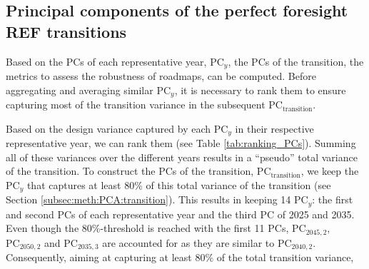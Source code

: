 \subsection{Principal components of the perfect foresight REF transitions}
\label{subsec:RobPol:PC_transition}
Based on the \gls{PCs} of each representative year, $\text{PC}_{y}$, the \gls{PCs} of the transition, \ie the metrics to assess the robustness of roadmaps, can be computed. Before aggregating and averaging similar $\text{PC}_{y}$, it is necessary to rank them to ensure capturing most of the transition variance in the subsequent $\text{PC}_{\text{transition}}$.

Based on the design variance captured by each $\text{PC}_{y}$ in their respective representative year, we can rank them (see Table \ref{tab:ranking_PCs}). Summing all of these variances over the different years results in a ``pseudo'' total variance of the transition. To construct the \gls{PCs} of the transition, $\text{PC}_{\text{transition}}$, we keep the $\text{PC}_{y}$ that captures at least 80\% of this total variance of the transition (see Section \ref{subsec:meth:PCA:transition}).  This results in keeping 14 $\text{PC}_{y}$: the first and second \gls{PCs} of each representative year and the third PC of 2025 and 2035. Even though the 80\%-threshold is reached with the first 11 \gls{PCs},  $\text{PC}_{2045,2}$, $\text{PC}_{2050,2}$ and $\text{PC}_{2035,3}$ are accounted for as they are similar to $\text{PC}_{2040,2}$. Consequently, aiming at capturing at least 80\% of the total transition variance, 

